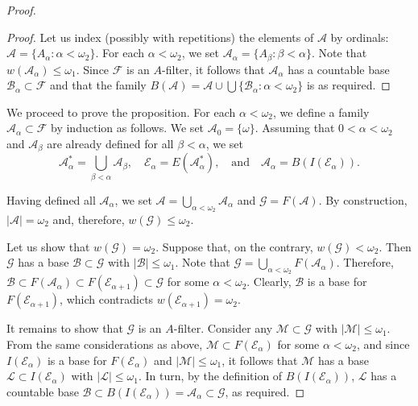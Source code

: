\documentclass[a4paper,12pt]{amsart}
\theoremstyle{definition}
\theoremstyle{remark}
\begin{document}
\begin{proof}
\begin{proof}
Let us index (possibly with repetitions) the elements of $\mathscr A$ by ordinals: $\mathscr 
A=\{A_\alpha:\alpha<\omega_2\}$. For each $\alpha<\omega_2$, we set 
$\mathscr A_\alpha=\{A_\beta:\beta<\alpha\}$. 
Note that $w(\mathscr A_\alpha)\le\omega_1$. Since 
$\mathscr F$ is an $A$-filter, it follows that 
$\mathscr A_\alpha$ has a countable base $\mathscr B_\alpha\subset \mathscr F$ and that
the family $B(\mathscr A)=\mathscr A\cup
\bigcup\{\mathscr B_\alpha:\alpha<\omega_2\}$ is as 
required. 
\end{proof}

We proceed to prove the proposition. For each $\alpha<\omega_2$, we define 
a family $\mathscr A_\alpha\subset\mathscr F$ by induction as follows. We set $\mathscr A_0=\{\omega\}$. 
Assuming that $0<\alpha<\omega_2$ and $\mathscr A_\beta$ are already defined for all $\beta<\alpha$,  
we set 
$$
\mathscr A_\alpha^\ast=\bigcup_{\beta<\alpha}\mathscr A_\beta,\quad 
\mathscr E_\alpha=E(\mathscr A_\alpha^\ast),\quad \text{and}\quad 
\mathscr A_\alpha=B(I(\mathscr E_\alpha)).
$$

Having defined all $\mathscr A_\alpha$, we set 
$\mathscr A=\bigcup_{\alpha<\omega_2}\mathscr A_\alpha$ and $\mathscr 
G=F(\mathscr A)$. By construction, $|\mathscr A|=\omega_2$ and, therefore, $w(\mathscr G)\leq\omega_2$.

Let us show that $w(\mathscr G)=\omega_2$. Suppose that, on the contrary, $w(\mathscr G)<\omega_2$. 
Then $\mathscr G$ has a base $\mathscr B\subset \mathscr G$ with $|\mathscr B|\leq\omega_1$. Note that 
$\mathscr G=\bigcup_{\alpha<\omega_2}F(\mathscr A_\alpha)$. Therefore, $\mathscr B\subset 
F(\mathscr A_\alpha)\subset F(\mathscr E_{\alpha+1})\subset \mathscr G$ for some $\alpha<\omega_2$. 
Clearly, $\mathscr B$ is a base for $F(\mathscr E_{\alpha+1})$, which 
contradicts $w(\mathscr E_{\alpha+1})=\omega_2$.

It remains to show that $\mathscr G$ is an $A$-filter. Consider any $\mathscr M\subset \mathscr G$ with 
$|\mathscr M|\leq\omega_1$. From the same considerations as above, $\mathscr M\subset F(\mathscr E_\alpha)$ for some 
$\alpha<\omega_2$, and since $I(\mathscr E_\alpha)$ is a base for $F(\mathscr E_\alpha)$ and 
$|\mathscr M|\le \omega_1$, 
it follows that $\mathscr M$ has a base $\mathscr L\subset I(\mathscr E_\alpha)$ with 
$|\mathscr L|\leq\omega_1$. In turn, by the definition of $B(I(\mathscr E_\alpha))$, 
$\mathscr L$ has a countable base $\mathscr B\subset B(I(\mathscr E_\alpha))=\mathscr A_\alpha\subset \mathscr G$, 
as required. 
\end{proof}
\end{document}
